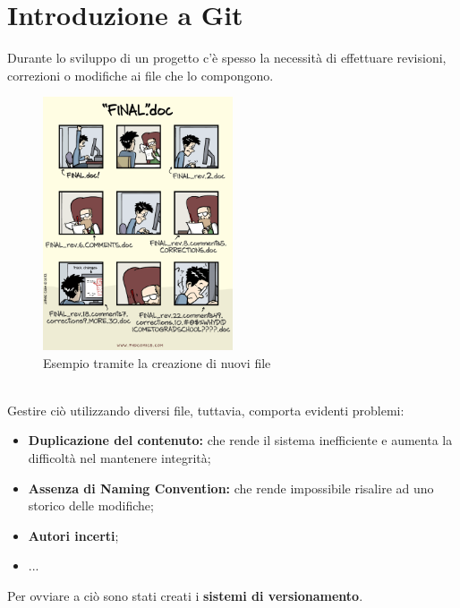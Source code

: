 \documentclass[12pt]{article}
\begin{document}
    \newpage
    \section{Introduzione a Git}
    Durante lo sviluppo di un progetto c'è spesso la necessità di effettuare revisioni, correzioni o modifiche ai file che lo compongono.
    \begin{figure}[h]
        \centering
        \includegraphics[width=0.5\textwidth]{introduzione_a_git/no_git_example.png}
        \caption{Esempio tramite la creazione di nuovi file}
        \label{fig:no_git_example}
    \end{figure}\\
    Gestire ciò utilizzando diversi file, tuttavia, comporta evidenti problemi:
    \begin{itemize}
      \item \textbf{Duplicazione del contenuto:} che rende il sistema inefficiente e aumenta la difficoltà nel mantenere integrità;
      \item \textbf{Assenza di Naming Convention:} che rende impossibile risalire ad uno storico delle modifiche;
      \item \textbf{Autori incerti};
      \item ...
    \end{itemize}
    Per ovviare a ciò sono stati creati i \textbf{sistemi di versionamento}.
\end{document}
